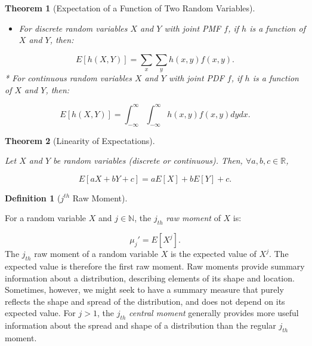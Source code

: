 \documentclass[
]{article}
\providecommand{\tightlist}{%
  \setlength{\itemsep}{0pt}\setlength{\parskip}{0pt}}
\newtheorem{theorem}{Theorem}[section]
\theoremstyle{definition}
\newtheorem{definition}{Definition}[section]
\theoremstyle{definition}
\theoremstyle{definition}
\theoremstyle{remark}
\begin{document}
\begin{theorem}[Expectation of a Function of Two Random Variables]
\protect\hypertarget{thm:unlabeled-div-62}{}\label{thm:unlabeled-div-62}

\begin{itemize}
\tightlist
\item
  For discrete random variables \(X\) and \(Y\) with joint PMF \(f\), if \(h\) is a function of \(X\) and \(Y\), then:
\end{itemize}

\[E[h(X,Y)] = \sum_x\sum_yh(x,y)f(x,y).\]
* For continuous random variables \(X\) and \(Y\) with joint PDF \(f\), if \(h\) is a function of \(X\) and \(Y\), then:

\[E[h(X,Y)] = \int_{-\infty}^{\infty}\int_{-\infty}^{\infty}h(x,y)f(x,y)dydx.\]

\end{theorem}

\begin{theorem}[Linearity of Expectations]
\protect\hypertarget{thm:unlabeled-div-63}{}\label{thm:unlabeled-div-63}

Let \(X\) and \(Y\) be random variables (discrete or continuous). Then, \(\forall a,b,c \in \mathbb{R}\),

\[E[aX + bY + c] = aE[X] + bE[Y] + c.\]

\end{theorem}

\begin{definition}[$j^{th}$ Raw Moment]
\protect\hypertarget{def:unlabeled-div-64}{}\label{def:unlabeled-div-64}

For a random variable \(X\) and \(j \in \mathbb{N}\), the \(j_{th}\) \emph{raw moment} of \(X\) is:

\[\mu_j' = E[X^j].\]
The \(j_{th}\) raw moment of a random variable \(X\) is the expected value of \(X^j\). The expected value is therefore the first raw moment. Raw moments provide summary information about a distribution, describing elements of its shape and location. Sometimes, however, we might seek to have a summary measure that purely reflects the shape and spread of the distribution, and does not depend on its expected value. For \(j > 1\), the \(j_{th}\) \emph{central moment} generally provides more useful information about the spread and shape of a distribution than the regular \(j_{th}\) moment.

\end{definition}
\end{document}
